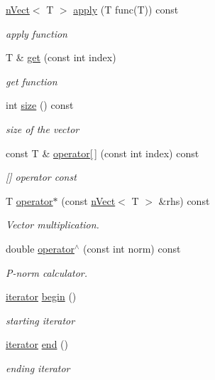 \begin{DoxyCompactItemize}
\hyperlink{classnVect}{n\+Vect}$<$ T $>$ \hyperlink{classnVect_a35964beca3a57fad4f69ddd6be16cc91}{apply} (T func(T)) const
\begin{DoxyCompactList}\small\item\em apply function \end{DoxyCompactList}\item 
T \& \hyperlink{classnVect_a4b757cc98836654ee2929197d40d9055}{get} (const int index)
\begin{DoxyCompactList}\small\item\em get function \end{DoxyCompactList}\item 
int \hyperlink{classnVect_a5cf871204b41c5cd97055b3c4ee9607c}{size} () const
\begin{DoxyCompactList}\small\item\em size of the vector \end{DoxyCompactList}\item 
const T \& \hyperlink{classnVect_a65b439185fd34563833ede9390612f1c}{operator\mbox{[}$\,$\mbox{]}} (const int index) const
\begin{DoxyCompactList}\small\item\em \mbox{[}\mbox{]} operator const \end{DoxyCompactList}\item 
T \hyperlink{classnVect_ac5933c6480457c627ca43a8b9d1cfbaf}{operator$\ast$} (const \hyperlink{classnVect}{n\+Vect}$<$ T $>$ \&rhs) const
\begin{DoxyCompactList}\small\item\em Vector multiplication. \end{DoxyCompactList}\item 
double \hyperlink{classnVect_a32237bab9097b7b392c467a79d858d1a}{operator$^\wedge$} (const int norm) const
\begin{DoxyCompactList}\small\item\em P-\/norm calculator. \end{DoxyCompactList}\item 
\hyperlink{classnVect_1_1iterator}{iterator} \hyperlink{classnVect_a0daf09e1f15ac627815d57f777ecc417}{begin} ()
\begin{DoxyCompactList}\small\item\em starting iterator \end{DoxyCompactList}\item 
\hyperlink{classnVect_1_1iterator}{iterator} \hyperlink{classnVect_a44a13c3cb3ede92ae23298920b1d88bf}{end} ()
\begin{DoxyCompactList}\small\item\em ending iterator \end{DoxyCompactList}\end{DoxyCompactItemize}
